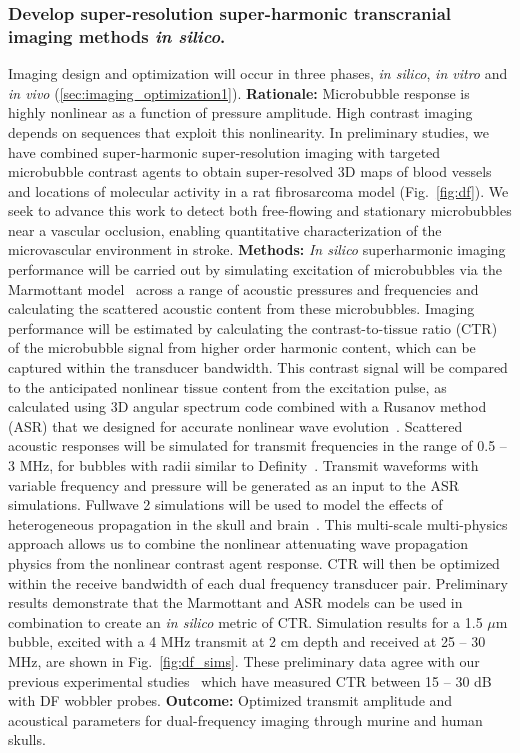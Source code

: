 \subsubsection{Develop super-resolution super-harmonic transcranial imaging methods \textit{in silico}.\label{sec:imaging}} Imaging design and optimization will occur in three phases, \textit{in silico}, \textit{in vitro} and \textit{in vivo} (\ref{sec:imaging_optimization1}).
\textbf{Rationale:}  Microbubble response is highly nonlinear as a function of pressure amplitude. High contrast imaging depends on  sequences that exploit this nonlinearity. In preliminary studies, we have combined super-harmonic super-resolution imaging with targeted microbubble contrast agents to  obtain super-resolved 3D maps of blood vessels and locations of molecular activity in a rat fibrosarcoma model (Fig.~\ref{fig:df})\cite{kierski2020super,kierski2022acoustic}. We seek to advance this work to detect both free-flowing and stationary microbubbles near a vascular occlusion, enabling quantitative characterization of the microvascular environment in stroke.
 \textbf{Methods:} \textit{In silico} superharmonic imaging performance will be carried out by simulating excitation of microbubbles via the Marmottant model~\cite{marmottant2005model} across a range of acoustic pressures and frequencies and calculating the scattered acoustic content from these microbubbles. Imaging performance will be estimated by calculating the contrast-to-tissue ratio (CTR) of the microbubble signal from higher order harmonic content, which can be captured within the transducer bandwidth. This contrast signal will be compared to the anticipated nonlinear tissue content from the excitation pulse, as calculated using 3D angular spectrum code combined with a Rusanov method (ASR) that we designed for accurate nonlinear wave evolution~\cite{luo2020rapid}. Scattered acoustic responses will be simulated for transmit frequencies in the range of 0.5 – 3 MHz, for bubbles with radii similar to Definity~\cite{goertz2007attenuation}. Transmit waveforms with variable frequency and pressure will be generated as an input to the ASR simulations. Fullwave 2 simulations will be used to model the effects of heterogeneous propagation in the skull and brain~\cite{pinton2009heterogeneous,pinton2021fullwave}. This multi-scale multi-physics approach allows us to combine the nonlinear attenuating wave propagation physics from the nonlinear contrast agent response. CTR will then be optimized within the receive bandwidth of each dual frequency transducer pair. Preliminary results demonstrate that the Marmottant and ASR models can be used in combination to create an \textit{in silico} metric of CTR. Simulation results for a 1.5 $\mu$m bubble, excited with a 4 MHz transmit at 2 cm depth and received at 25 – 30 MHz, are shown in Fig.~\ref{fig:df_sims}. These preliminary data agree with our previous experimental studies~\cite{newsome2020visualization,newsome2021implementation} which have measured CTR between 15 – 30 dB with DF wobbler probes.
\textbf{Outcome:} Optimized transmit amplitude and acoustical parameters for dual-frequency imaging through murine and human skulls.


